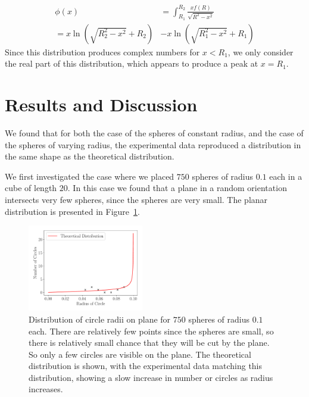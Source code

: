 \documentclass[journal]{IEEEtran}
\begin{document}
\begin{equation}
\begin{split}
  \phi(x) & = \int_{R_1}^{R_2}\frac{xf(R)}{\sqrt{R^2 - x^2}} \\
  = x\ln\left(\sqrt{R_2^2 - x^2}+R_2\right) & - x\ln\left(\sqrt{R_1^2 - x^2}+R_1\right)
\end{split}
\end{equation}
Since this distribution produces complex numbers for $ x < R_1$, we only
consider the real part of this distribution, which appears to produce a peak at
$x = R_1$.

\section{Results and Discussion}

We found that for both the case of the spheres of constant radius, and the case
of the spheres of varying radius, the experimental data reproduced a
distribution in the same shape as the theoretical distribution.

We first investigated the case where we placed $750$ spheres of radius $0.1$
each in a cube of length $20$. In this case we found that a plane in a random
orientation intersects very few spheres, since the spheres are very small. The
planar distribution is presented in Figure~\ref{fig:size1}.

\begin{figure}%
\begin{center}
\includegraphics[width=0.45\textwidth]{./../Figures/750_01.pdf}
\caption{Distribution of circle radii on plane for $750$ spheres of radius $0.1$
  each. There are relatively few points since the spheres are small, so there is
  relatively small chance that they will be cut by the plane. So only a few
  circles are visible on the plane. The theoretical distribution is shown, with
  the experimental data matching this distribution, showing a slow increase in
  number or circles as radius increases.}\label{fig:size1}
\end{center}
\end{figure}
\end{document}
